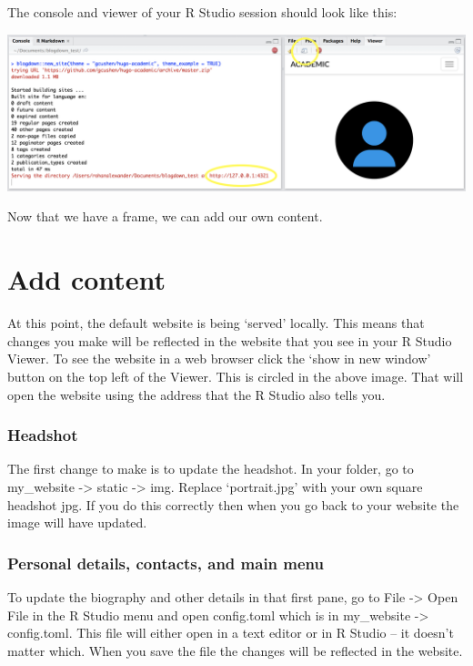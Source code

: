 \documentclass[
]{book}
\begin{document}
The console and viewer of your R Studio session should look like this:

\includegraphics[width=32.78in]{figures/images/blogdown_serve_site}

Now that we have a frame, we can add our own content.

\hypertarget{add-content}{%
\section{Add content}\label{add-content}}

At this point, the default website is being `served' locally. This means that changes you make will be reflected in the website that you see in your R Studio Viewer. To see the website in a web browser click the `show in new window' button on the top left of the Viewer. This is circled in the above image. That will open the website using the address that the R Studio also tells you.

\hypertarget{headshot}{%
\subsubsection{Headshot}\label{headshot}}

The first change to make is to update the headshot. In your folder, go to my\_website -\textgreater{} static -\textgreater{} img. Replace `portrait.jpg' with your own square headshot jpg. If you do this correctly then when you go back to your website the image will have updated.

\hypertarget{personal-details-contacts-and-main-menu}{%
\subsubsection{Personal details, contacts, and main menu}\label{personal-details-contacts-and-main-menu}}

To update the biography and other details in that first pane, go to File -\textgreater{} Open File in the R Studio menu and open config.toml which is in my\_website -\textgreater{} config.toml. This file will either open in a text editor or in R Studio -- it doesn't matter which. When you save the file the changes will be reflected in the website.
\end{document}
